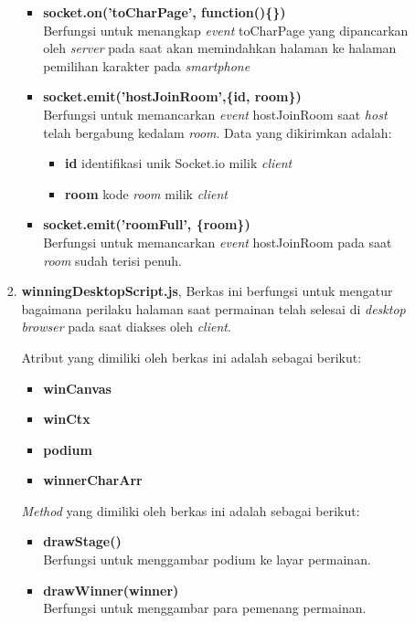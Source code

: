 \begin{enumerate}
\begin{enumerate}
\begin{enumerate}
\begin{itemize}
				\item \textbf{socket.on('toCharPage', function()\{\})} \\
				Berfungsi untuk menangkap \textit{event} toCharPage yang dipancarkan oleh \textit{server} pada saat akan memindahkan halaman ke halaman pemilihan karakter pada \textit{smartphone}
				
				\item \textbf{socket.emit('hostJoinRoom',\{id, room\})} \\
				Berfungsi untuk memancarkan \textit{event} hostJoinRoom saat \textit{host} telah bergabung kedalam \textit{room}. Data yang dikirimkan adalah:
				\begin{itemize}
					\item \textbf{id} identifikasi unik Socket.io milik \textit{client}
					\item \textbf{room} kode \textit{room} milik \textit{client}
				\end{itemize}
			
				\item \textbf{socket.emit('roomFull', \{room\})} \\
				Berfungsi untuk memancarkan \textit{event} hostJoinRoom pada saat \textit{room} sudah terisi penuh.	
				
			\end{itemize}
			
			\item \textbf{winningDesktopScript.js}, Berkas ini berfungsi untuk mengatur bagaimana perilaku halaman saat permainan telah selesai di \textit{desktop browser} pada saat diakses oleh \textit{client}.
			
			Atribut yang dimiliki oleh berkas ini adalah sebagai berikut:
			\begin{itemize}
				\item \textbf{winCanvas}
				\item \textbf{winCtx}
				\item \textbf{podium}
				\item \textbf{winnerCharArr}
			\end{itemize}
			
			\textit{Method} yang dimiliki oleh berkas ini adalah sebagai berikut:
			\begin{itemize}
				\item \textbf{drawStage()} \\
				Berfungsi untuk menggambar podium ke layar permainan.
				
				\item \textbf{drawWinner(winner)} \\
				Berfungsi untuk menggambar para pemenang permainan.
				

\end{itemize}
\end{enumerate}
\end{enumerate}
\end{enumerate}
